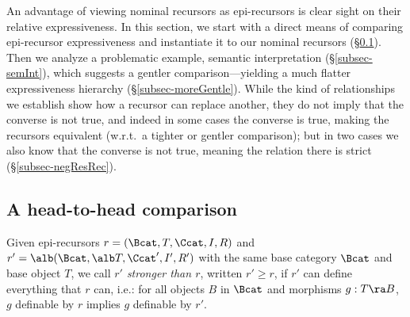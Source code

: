 An advantage of viewing nominal recursors as epi-recursors is %
clear sight on their relative expressiveness. 
%
In this section, we start with %
a %
direct means of comparing epi-recursor expressiveness 
and instantiate it to our nominal recursors (\S\ref{subsec-compareHeadToHead}). 
Then we analyze a %
problematic example, semantic interpretation (\S\ref{subsec-semInt}), which suggests a gentler comparison---yielding a much flatter expressiveness hierarchy (\S\ref{subsec-moreGentle}).  
While the kind of relationships we establish show how a recursor can replace another, they do not imply that 
the converse is not true, and indeed in some cases the converse is true, making the recursors equivalent (w.r.t.\ 
a tighter or gentler comparison); but in two cases we also know that the converse is not true, meaning the 
relation there is strict %
(\S\ref{subsec-negResRec}). 


\vspace*{-0.5ex}\subsection{A head-to-head comparison} 
\label{subsec-compareHeadToHead}

\begin{defi} \rm \label{defi-strong}
Given %
epi-recursors $r = (\Bcat,T,\Ccat,I,R)$ and $r' = \alb(\Bcat,\alb T,\Ccat',I',R')$ 
with the same base category $\Bcat$ and base object $T$, we %
call \emph{$r'$ stronger than $r$}, written $r' \geq r$, if $r'$ can define everything that  
$r$ can, %
i.e.: 
for all objects $B$ in $\Bcat$ and morphisms 
$g: T \ra B$, %
$g$ definable by $r$ implies $g$ definable by $r'$.   %
{}
\end{defi} 




